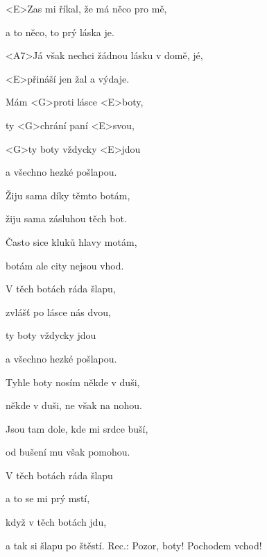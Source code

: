 

\zs
<E>Zas mi říkal, že má něco pro mě,

a to něco, to prý láska je.

<A7>Já však nechci žádnou lásku v domě, jé,

<E>přináší jen žal a výdaje.

Mám <G>proti lásce <E>boty,

ty <G>chrání paní <E>svou,

<G>ty boty vždycky <E>jdou

a všechno hezké pošlapou.
\ks

\zs
Žiju sama díky těmto botám,

žiju sama zásluhou těch bot.

Často sice kluků hlavy motám,

botám ale city nejsou vhod.

V těch botách ráda šlapu,

zvlášť po lásce nás dvou,

ty boty vždycky jdou

a všechno hezké pošlapou.
\ks

\zs
Tyhle boty nosím někde v duši,

někde v duši, ne však na nohou.

Jsou tam dole, kde mi srdce buší,

od bušení mu však pomohou.

V těch botách ráda šlapu

a to se mi prý mstí,

když v těch botách jdu,

a tak si šlapu po štěstí. Rec.: Pozor, boty! Pochodem vchod!
\ks

\kp






















